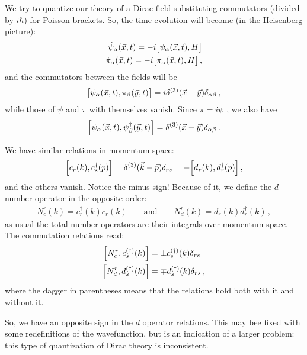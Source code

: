 \documentclass[main.tex]{subfiles}
\begin{document}
We try to quantize our theory of a Dirac field substituting commutators (divided by \(i \hbar\)) for Poisson brackets. So, the time evolution will become (in  the Heisenberg picture): 
%
\begin{subequations}
\begin{align}
\dot{\psi}_{\alpha } (\vec{x}, t) =- i \qty[ \psi_{\alpha } (\vec{x}, t), H] \\
\dot{\pi}_{\alpha } (\vec{x}, t) =- i \qty[ \pi_{\alpha } (\vec{x}, t), H]
\,,
\end{align}
\end{subequations}
%
and the commutators between the fields will be 
%
\begin{align}
\qty[\psi_{\alpha }(\vec{x}, t), \pi_{\beta } (\vec{y}, t)] = i \delta^{(3)} (\vec{x} - \vec{y}) \delta_{\alpha \beta }
\,,
\end{align}
%
while those of \(\psi \) and \(\pi \) with themselves vanish. 
Since \(\pi  = i \psi ^\dag\), we also have 
%
\begin{align}
\qty[ \psi_{\alpha } (\vec{x}, t), \psi ^\dag_{\beta} (\vec{y}, t)] = \delta^{(3)} (\vec{x}- \vec{y}) \delta_{\alpha \beta }
\,.
\end{align}

We have similar relations in momentum space: 
%
\begin{align}
\qty[c_r (k), c_s ^\dag (p)] = \delta^{(3)} (\vec{k} - \vec{p}) \delta_{rs} = - \qty[d_r (k), d_r ^\dag (p)]
\,,
\end{align}
%
and the others vanish. Notice the minus sign! 
Because of it, we define the \(d\) number operator in the opposite order: 
%
\begin{align}
N_c^{r} (k) = c_r ^\dag (k) c_r (k)
\qquad \text{and} \qquad
N_d^{r} (k) = d_r (k) d_r  ^\dag (k)
\,,
\end{align}
%
as usual the total number operators are their integrals over momentum space. 
The commutation relations read: 
%
\begin{subequations}
\begin{align}
\qty[N_c^{r}, c_s ^{(\dag)} (k)] &= \pm c_s ^{(\dag)} (k) \delta_{rs} \\
\qty[N_d^{r}, d_s ^{(\dag)} (k)] &= \mp d_s ^{(\dag)} (k) \delta_{rs}
\,,
\end{align}
\end{subequations}
%
where the dagger in parentheses means that the relations hold both with it and without it. 

So, we have an opposite sign in the \(d\) operator relations. This may bee fixed with some redefinitions of the wavefunction, but is an indication of a larger problem: this type of quantization of Dirac theory is inconsistent. 
\end{document}
